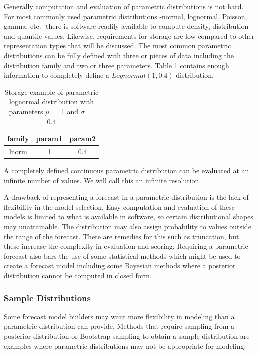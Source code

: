 \documentclass[11pt,notitlepage]{isuthesis}
\begin{document}
Generally computation and evaluation of parametric distributions is not hard. 
For most commonly used parametric distributions -normal, lognormal, Poisson,
gamma, etc.- there is software readily available to compute density, 
distribution and quantile values. Likewise, requirements for storage are low 
compared to other representation types that will be discussed. The most common
parametric distributions can be fully defined with three or pieces of data
including
the distribution family and two or three parameters. Table \ref{table:pstor} 
contains
enough information to completely define a $Lognormal(1,0.4)$ distribution.

\begin{table}[h!]

\centering
 \begin{tabular}{|c c c|} 
 \hline
 family & param1 & param2 \\ [0.5ex] 
 \hline
 lnorm & 1 & 0.4 \\ 
 \hline
 \end{tabular}
 \caption[Parametric distribution storage]{Storage example of parametric 
 lognormal 
 distribution with 
 parameters $\mu = $ 1 and $\sigma =$ 0.4}
 \label{table:pstor}
\end{table}

A completely defined continuous parametric distribution can be evaluated at an
infinite number of values. We will call this an infinite resolution.


A drawback of representing a forecast in a parametric distribution is the lack 
of flexibility in the model selection. Easy computation and evaluation of these 
models is limited to what is available in software, so certain distributional
shapes may unattainable. The distribution may also assign probability to values
outside the range of the forecast. There are remedies for this such as 
truncation, but these increase the complexity in evaluation and scoring.
Requiring a parametric forecast also bars the use of some statistical methods
which might be used to create a forecast model including some Bayesian methods
where a posterior distribution cannot be computed in closed form.


\subsubsection{Sample Distributions}
Some forecast model builders may want more flexibility in modeling than a 
parametric 
distribution can provide. Methods that require sampling from a posterior 
distribution or Bootstrap sampling to obtain a sample distribution are examples
where parametric distributions may not be appropriate for modeling.
\end{document}
